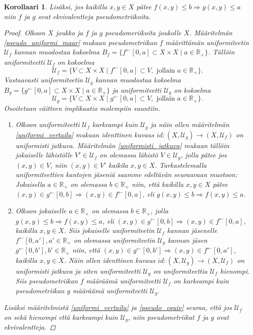 \documentclass[12pt,a4paper,leqno]{report}
\newcommand{\R}{\mathbb{R}}
\newcommand{\U}{\mathcal{U}}
\theoremstyle{plain}
\newtheorem{kor}[equation]{Korollaari}
\theoremstyle{definition}
\theoremstyle{remark}
\begin{document}
\begin{kor}
Lisäksi, jos kaikilla $x,y\in X$ pätee $f(x,y)\leq b \Rightarrow g(x,y)\leq a$ niin $f$ ja $g$ ovat ekvivalentteja pseudometriikoita.
\begin{proof}
Olkoon $X$ joukko ja $f$ ja $g$ pseudomeriikoita joukolle $X$. 
Määritelmän \ref{pseudo_uniformi_maar} mukaan pseudometriikan $f$ määrittämän uniformiteetin $\U_f$ kannan muodostaa kokoelma $B_f=\{ f^{\leftarrow}[0,a]\subset X\times X\mid a\in\R_+\}$. 
Tällöin uniformiteetti $ \U_f$ on kokoelma 
$$\U_f=\{ V\subset X\times X\mid f^{\leftarrow}[0,a]\subset V, \text{ jollain } a\in\R_+\}.$$
Vastaavasti uniformiteetin $\U_g$ kannan muodostaa kokoelma $B_g=\{ g^{\leftarrow}[0,a]\subset X\times X\mid a\in\R_+\}$ ja uniformiteetti $ \U_g$ on kokoelma 
$$\U_g=\{ V\subset X\times X\mid g^{\leftarrow}[0,a]\subset V, \text{ jollain } a\in\R_+\}.$$ 
Osoitetaan väitteen implikaatio molempiin suuntiin.
\begin{enumerate}
\item[$\Rightarrow$] 
Olkoon uniformiteetti $\U_f$ karkeampi kuin $\U_g$ ja näin ollen määritelmän \ref{uniformi_vertailu} mukaan identtinen kuvaus $id\colon(X,\U_g)\rightarrow(X,\U_f)$ on uniformisti jatkuva. 
Määritelmän \ref{uniformisti_jatkuva} mukaan tällöin jokaiselle %
lähistölle $V'\in\U_f $ on olemassa %
lähistö $V\in\U_g $, jolla pätee jos $(x,y)\in V$, niin $(x,y)\in V'$ kaikila $x,y\in X$. Tarkastelemalla uniformiteettien kantojen jäseniä saamme edeltävän seuraavaan muotoon: Jokaisella $a\in\R_+$ on olemassa $b\in\R_+$ niin, että kaikilla $x,y\in X$ pätee $(x,y)\in g^{\leftarrow}[0,b]\Rightarrow (x,y)\in f^{\leftarrow}[0,a]$, eli $g(x,y)\leq b\Rightarrow f(x,y) \leq a$.
\item[$\Leftarrow$] Olkoon jokaiselle 
$a\in\R_+$ on olemassa $b\in\R_+$, jolla $g(x,y)\leq b \Rightarrow f(x,y)\leq a$, eli $(x,y)\in g^{\leftarrow}[0,b]\Rightarrow (x,y)\in f^{\leftarrow}[0,a]$, kaikilla $x,y\in X$. 
Siis jokaiselle uniformiteetin $\U_f$ kannan jäsenelle $f^{\leftarrow}[0,a'],a'\in\R_+ $ on olemassa uniformiteetin $\U_g$ kannan jäsen $g^{\leftarrow}[0,b'],b'\in\R_+$ niin, että $(x,y)\in g^{\leftarrow}[0,b']\Rightarrow (x,y)\in f^{\leftarrow}[0,a']$, kaikilla $x,y\in X$. 
Näin ollen identtinen kuvaus $id\colon (X,\U_g)\rightarrow (X,\U_f)$ on uniformisti jatkuva ja siten uniformiteetti $\U_g$ on uniformiteettia $\U_f$ hienompi. %
Siis pseudometriikan $f$ määräämä uniformiteetti 
$\U_f$ 
on karkeampi kuin pseudometriikan $g$ määräämä uniformiteetti $\U_g$.
\end{enumerate}
Lisäksi 
määritelmistä \ref{uniformi_vertailu} ja \ref{pseudo_equiv} seuraa, että jos $\U_f$ on sekä hienompi että karkeampi kuin $\U_g$, niin pseudometriikat $f$ ja $g$ ovat ekvivalentteja.
\end{proof}
\end{kor}
\end{document}
